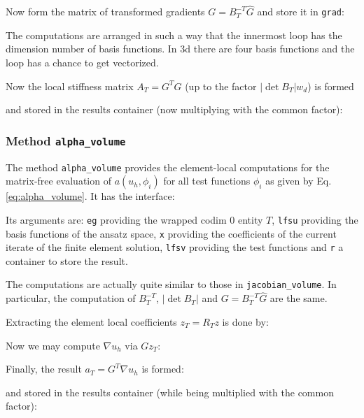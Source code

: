 \documentclass[a4paper,12pt]{article}
\begin{document}
Now form the matrix of transformed gradients $G=B_T^{-T} \hat G$ 
and store it in \lstinline{grad}:

The computations are arranged in such a way that the innermost loop
has the dimension number of basis functions. In 3d there are four basis functions
and the loop has a chance to get vectorized.

Now the local stiffness matrix $A_T = G^T G$ (up to the factor $|\det B_T| w_d$) is formed

and stored in the results container (now multiplying with the common factor):


\subsubsection*{Method \lstinline{alpha_volume}}

The method \lstinline{alpha_volume} provides the element-local computations
for the matrix-free evaluation of $a(u_h,\phi_i)$ for all test functions $\phi_i$
as given by Eq.\eqref{eq:alpha_volume}. It has the interface:

Its arguments are: \lstinline{eg} providing the wrapped codim 0 entity $T$,
\lstinline{lfsu} providing the basis functions of the ansatz space,
\lstinline{x} providing the coefficients of the current iterate 
of the finite element solution, \lstinline{lfsv} providing the test functions
and \lstinline{r} a container to store the result.

The computations are actually quite similar to those in \lstinline{jacobian_volume}.
In particular, the computation of $B_T^{-T}$, $|\det B_T|$ and $G = B_T^{-T} \hat G$
are the same.

Extracting the element local coefficients $z_T = R_T z$ is done by:

Now we may compute $\nabla u_h$ via $G z_T$:

Finally, the result $a_T = G^T \nabla u_h$ is formed:

and stored in the results container (while being multiplied with the common factor):

\end{document}

